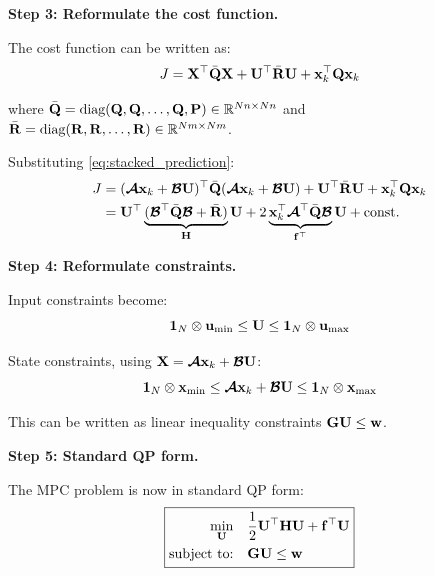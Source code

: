 \textbf{Step 3: Reformulate the cost function.}

The cost function can be written as:
\begin{equation}
    J = \mathbf{X}^\top \bar{\mathbf{Q}} \mathbf{X} + \mathbf{U}^\top \bar{\mathbf{R}} \mathbf{U} + \mathbf{x}_k^\top \mathbf{Q} \mathbf{x}_k
\end{equation}

where $\bar{\mathbf{Q}} = \text{diag}(\mathbf{Q}, \mathbf{Q}, \ldots, \mathbf{Q}, \mathbf{P}) \in \mathbb{R}^{Nn \times Nn}$ and $\bar{\mathbf{R}} = \text{diag}(\mathbf{R}, \mathbf{R}, \ldots, \mathbf{R}) \in \mathbb{R}^{Nm \times Nm}$.

Substituting \eqref{eq:stacked_prediction}:
\begin{align}
    J &= (\boldsymbol{\mathcal{A}} \mathbf{x}_k + \boldsymbol{\mathcal{B}} \mathbf{U})^\top \bar{\mathbf{Q}} (\boldsymbol{\mathcal{A}} \mathbf{x}_k + \boldsymbol{\mathcal{B}} \mathbf{U}) + \mathbf{U}^\top \bar{\mathbf{R}} \mathbf{U} + \mathbf{x}_k^\top \mathbf{Q} \mathbf{x}_k \\
    &= \mathbf{U}^\top \underbrace{(\boldsymbol{\mathcal{B}}^\top \bar{\mathbf{Q}} \boldsymbol{\mathcal{B}} + \bar{\mathbf{R}})}_{\mathbf{H}} \mathbf{U} + 2 \underbrace{\mathbf{x}_k^\top \boldsymbol{\mathcal{A}}^\top \bar{\mathbf{Q}} \boldsymbol{\mathcal{B}}}_{\mathbf{f}^\top} \mathbf{U} + \text{const.}
\end{align}

\textbf{Step 4: Reformulate constraints.}

Input constraints become:
\begin{equation}
    \mathbf{1}_{N} \otimes \mathbf{u}_{\min} \leq \mathbf{U} \leq \mathbf{1}_{N} \otimes \mathbf{u}_{\max}
\end{equation}

State constraints, using $\mathbf{X} = \boldsymbol{\mathcal{A}} \mathbf{x}_k + \boldsymbol{\mathcal{B}} \mathbf{U}$:
\begin{equation}
    \mathbf{1}_{N} \otimes \mathbf{x}_{\min} \leq \boldsymbol{\mathcal{A}} \mathbf{x}_k + \boldsymbol{\mathcal{B}} \mathbf{U} \leq \mathbf{1}_{N} \otimes \mathbf{x}_{\max}
\end{equation}

This can be written as linear inequality constraints $\mathbf{G}\mathbf{U} \leq \mathbf{w}$.

\textbf{Step 5: Standard QP form.}

The MPC problem is now in standard QP form:
\begin{equation}
\boxed{
\begin{aligned}
    \min_{\mathbf{U}} \quad & \frac{1}{2} \mathbf{U}^\top \mathbf{H} \mathbf{U} + \mathbf{f}^\top \mathbf{U} \\
    \text{subject to:} \quad & \mathbf{G} \mathbf{U} \leq \mathbf{w}
\end{aligned}
}
\label{eq:standard_qp}
\end{equation}

